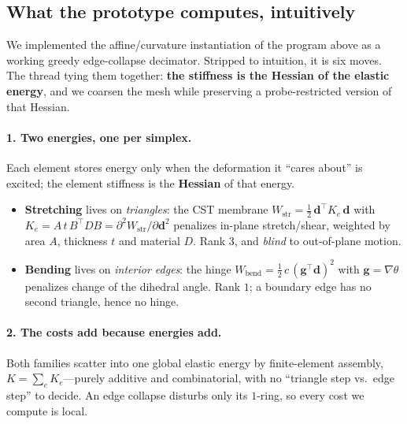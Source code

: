 \clearpage

\subsection{What the prototype computes, intuitively}

We implemented the affine/curvature instantiation of the program above as a working greedy edge-collapse decimator.
Stripped to intuition, it is six moves.
The thread tying them together: \textbf{the stiffness is the Hessian of the elastic energy}, and we coarsen the mesh while preserving a probe-restricted version of that Hessian.

\paragraph{1. Two energies, one per simplex.}
Each element stores energy only when the deformation it ``cares about'' is excited; the element stiffness is the \textbf{Hessian} of that energy.
\begin{itemize}
  \item \textbf{Stretching} lives on \emph{triangles}: the CST membrane $W_{\text{str}}=\tfrac12\,\mathbf{d}^\top K_e\,\mathbf{d}$ with $K_e=A\,t\,B^\top D B=\partial^2 W_{\text{str}}/\partial\mathbf{d}^2$ penalizes in-plane stretch/shear, weighted by area $A$, thickness $t$ and material $D$.
        Rank $3$, and \emph{blind} to out-of-plane motion.
  \item \textbf{Bending} lives on \emph{interior edges}: the hinge $W_{\text{bend}}=\tfrac12\,c\,(\mathbf{g}^\top\mathbf{d})^2$ with $\mathbf{g}=\nabla\theta$ penalizes change of the dihedral angle.
        Rank $1$; a boundary edge has no second triangle, hence no hinge.
\end{itemize}

\paragraph{2. The costs add because energies add.}
Both families scatter into one global elastic energy by finite-element assembly, $K=\sum_e K_e$---purely additive and combinatorial, with no ``triangle step vs.\ edge step'' to decide.
An edge collapse disturbs only its $1$-ring, so every cost we compute is local.

